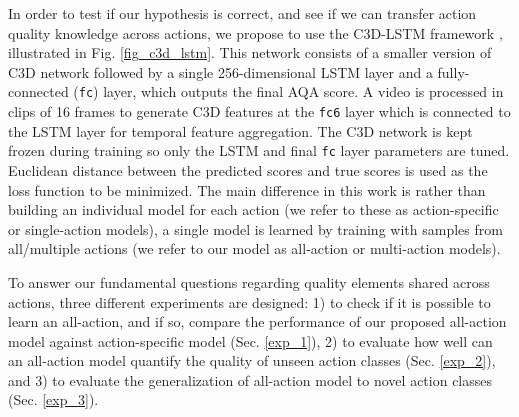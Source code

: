 \documentclass[10pt,twocolumn,letterpaper]{article}
\begin{document}
In order to test if our hypothesis is correct, and see if we can transfer action quality knowledge across actions, we propose to use the C3D-LSTM framework \cite{parmar}, illustrated in Fig. \ref{fig_c3d_lstm}. This network consists of a smaller version of C3D network \cite{c3d} followed by a single 256-dimensional LSTM \cite{lstm} layer and a fully-connected (\texttt{fc}) layer, which outputs the final AQA score. A video is processed in clips of 16 frames to generate C3D features at the \texttt{fc6} layer which is connected to the LSTM layer for temporal feature aggregation. The C3D network is kept frozen during training so only the LSTM and final \texttt{fc} layer parameters are tuned. Euclidean distance between the predicted scores and true scores is used as the loss function to be minimized. The main difference in this work is rather than building an individual model for each action (we refer to these as action-specific or single-action models), a single model is learned by training with samples from all/multiple actions (we refer to our model as all-action or multi-action models).

To answer our fundamental questions regarding quality elements shared across actions, three different experiments are designed: 1) to check if it is possible to learn an all-action, and if so, compare the performance of our proposed all-action model against action-specific model (Sec. \ref{exp_1}), 2) to evaluate how well can an all-action model quantify the quality of unseen action classes (Sec. \ref{exp_2}), and 3) to evaluate the generalization of all-action model to novel action classes (Sec. \ref{exp_3}).  
\end{document}
